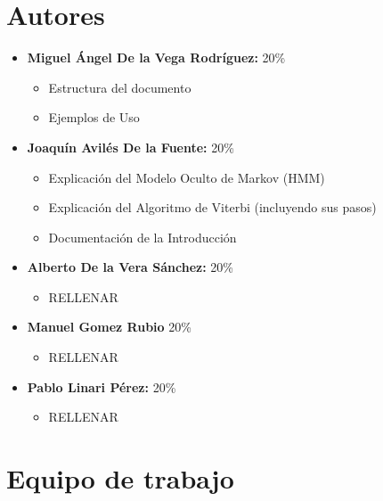 \documentclass[11pt,openany]{book}
\begin{document}
\tableofcontents %
\newpage %


\chapter{Autores}
\begin{itemize}
      \item \textbf{Miguel Ángel De la Vega Rodríguez:} 20\%
            \begin{itemize}
                  \item Estructura del documento
                  \item Ejemplos de Uso
            \end{itemize}
      \item \textbf{Joaquín Avilés De la Fuente:} 20\%
            \begin{itemize}
                  \item Explicación del Modelo Oculto de Markov (HMM)
                  \item Explicación del Algoritmo de Viterbi (incluyendo sus pasos)
                  \item Documentación de la Introducción
            \end{itemize}
      \item \textbf{Alberto De la Vera Sánchez: } 20\%
            \begin{itemize}
                  \item RELLENAR
            \end{itemize}
      \item \textbf{Manuel Gomez Rubio} 20\%
            \begin{itemize}
                \item RELLENAR
            \end{itemize}
      \item \textbf{Pablo Linari Pérez:} 20\%
            \begin{itemize}
                  \item RELLENAR
            \end{itemize}
\end{itemize}

\chapter{Equipo de trabajo}
\end{document}

